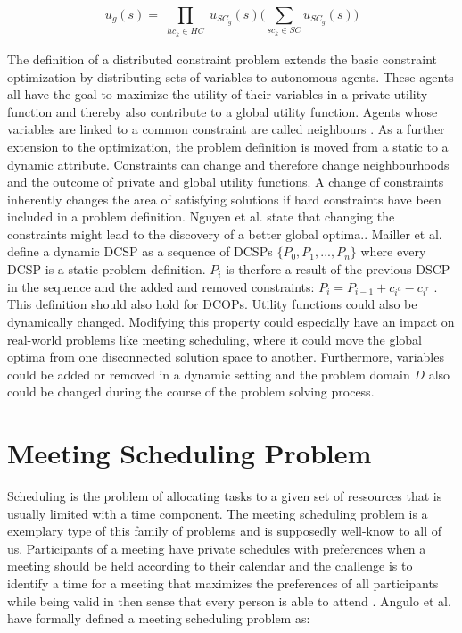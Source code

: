 \[ u_{g}(s) = \prod_{\substack{hc_{k} \in HC}} u_{SC_{g}}(s) \bigg( \sum_{sc_{k} \in SC} u_{SC_{g}}(s) \bigg)\] 


The definition of a distributed constraint problem extends the basic constraint optimization by distributing sets of variables to autonomous agents. These agents all have the goal to maximize the utility of their variables in a private utility function and thereby also contribute to a global utility function. Agents whose variables are linked to a common constraint are called neighbours \cite{Chapman2011, Farinelli, Petcu2003}.
\newline\newline 
As a further extension to the optimization, the problem definition is moved from a static to a dynamic attribute. Constraints can change and  therefore change neighbourhoods and the outcome of private and global utility functions. A change of constraints inherently changes the area of satisfying solutions if hard constraints have been included in a problem definition. Nguyen et al. state that changing the constraints might lead to the discovery of a better global optima.\cite{Nguyen2012}. Mailler et al. define a dynamic DCSP as a sequence of DCSPs \(\{P_{0}, P_{1}, ..., P_{n}\}\) where every DCSP is a static problem definition. \(P_{i}\) is therfore a result of the previous DSCP in the sequence and the added and removed constraints: \(P_{i} = P_{i-1} + c_{i^{a}} - c_{i^{r}}\) \cite{Maillera}. This definition should also hold for DCOPs. Utility functions could also be dynamically changed. Modifying this property could especially have an impact on real-world problems like meeting scheduling, where it could move the global optima from one disconnected solution space to another\cite{Nguyen2012}. Furthermore, variables could be added or removed in a dynamic setting and the problem domain \(D\) also could be changed during the course of the problem solving process.

\section{Meeting Scheduling Problem}  

Scheduling is the problem of allocating tasks to a given set of ressources that is usually limited with a time component. The meeting scheduling problem is a exemplary type of this family of problems and is supposedly well-know to all of us. Participants of a meeting have private schedules with preferences when a meeting should be held according to their calendar and the challenge is to identify a time for a meeting that maximizes the preferences of all participants while being valid in then sense that every person is able to attend \cite{Farinelli}. Angulo et al. have formally defined a meeting scheduling problem as:

